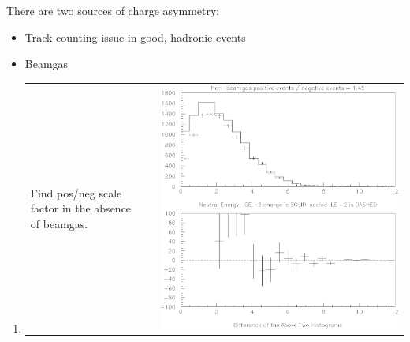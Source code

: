 \begin{slide*}

\slideframe{}
\huge
{}

\begin{minipage}[t]{\linewidth}
\LARGE

There are two sources of charge asymmetry:

\begin{flushleft}
\begin{itemize}
  \item Track-counting issue in good, hadronic events
  \item Beamgas
\end{itemize}
\end{flushleft}

\begin{flushleft}
\begin{enumerate}
  \item \begin{tabular}{l c r}
  \begin{minipage}{3 in}
    Find pos/neg scale factor in the absence of beamgas.
  \end{minipage}
  & \hspace{0.5 in} & 
  \begin{minipage}{1.5 in}
    \includegraphics[width=\linewidth]{scale_non_beamgas.eps}
  \end{minipage}
\end{tabular}


\end{enumerate}
\end{flushleft}
\end{minipage}
\end{slide*}
